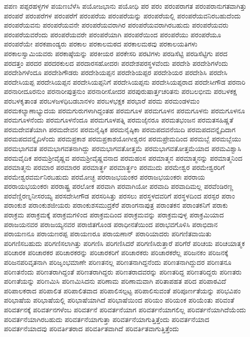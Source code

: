 {ಪಪಣ
ಪಪ್ಪರಹಳ್ಳಗಳ
ಪಯಣಬೆಳೆಸಿ
ಪಯೋಜಭಾನು
ಪಯೋಧಿ
ಪರ
ಪರಂ
ಪರಂಪರಾಗತ
ಪರಂಪರಾನುಗತವಾಗಿತ್ತು
ಪರಂಪರೆ
ಪರಂಪರೆಗಳ
ಪರಂಪರೆಗೆ
ಪರಂಪರೆಯ
ಪರಂಪರೆಯನ್ನು
ಪರಂಪರೆಯಲ್ಲಿ
ಪರಂಪರೆಯವನಿರಬಹುದೆಂದು
ಪರಂಪರೆಯವನು
ಪರಂಪರೆಯವನೇ
ಪರಂಪರೆಯವರಾಗಿರ
ಪರಂಪರೆಯವರಾಗಿರಬಹುದು
ಪರಂಪರೆಯವರು
ಪರಂಪರೆಯವರೆಂದು
ಪರಂಪರೆಯವರೇ
ಪರಂಪರೆಯಾಗಿ
ಪರಂಪರೆಯಿಂದ
ಪರಂಪರೆಯು
ಪರಂಪರೆಯೂ
ಪರಂಪರೆಯೇ
ಪರಕಪಾಂಡ್ಯರು
ಪರಕಾಲ
ಪರಕಾಲಮಠದ
ಪರಕಾಲಮಠವು
ಪರಕಾಲಯತಿಗಳು
ಪರಕಾಲಸ್ವಾಮಿಯವರು
ಪರಕಾಷ್ಠೆಯನ್ನು
ಪರಕೀಯರ
ಪರಕೇಸರಿ
ಪರಟಿಗಳು
ಪರಡಿಸೆಟ್ಟಿ
ಪರಡಿಸೆಟ್ಟಿಗು
ಪರದ
ಪರದತ್ತಂ
ಪರದರ
ಪರದರಕುಲದ
ಪರದಾರಸಹೋದರಃ
ಪರದೇಶಪರಸ್ಥಳವೆಂದು
ಪರದೇಶಿ
ಪರದೇಶಿಗಳೆಂದು
ಪರದೇಶಿಗಳೆಂದೂ
ಪರದೇಶಿಗೌಡರು
ಪರದೇಶಿಯಪ್ಪನ
ಪರದೇಶಿಯಪ್ಪರ
ಪರದೇಶಿಯರ
ಪರದೇಶಿಸಿ
ಪರದೇಸಿ
ಪರದೇಸಿಯಪ್ಪ
ಪರದೇಸಿಯಪ್ಪನ
ಪರದೇಸಿಯಪ್ಪನಿಗೆ
ಪರದೇಸಿಯಪ್ಪನು
ಪರದೇಸಿಯಪ್ಪರಾದ
ಪರದೇಸೀಗೌಡ
ಪರನಾರಿ
ಪರನಾರೀದೂರನುಂ
ಪರನಾರೀಪುತ್ರನುಂ
ಪರನಾರೀಸೋದರ
ಪರಪುರುಷಾರ್ತ್ತಚರಿತನು
ಪರಬಲಭೀಮ
ಪರಬಳಕಕ್ಷ
ಪರಬಳಕೃತಾಂತ
ಪರಬಳಜಳಧಿಬಡಬಾನಳಂ
ಪರಬಳಭಕ್ಷಕ
ಪರಭಾರೆ
ಪರಮ
ಪರಮಂಡಳಮಂ
ಪರಮಕಲ್ಯಾಣಾಭ್ಯುದಯ
ಪರಮಗುರುಗಳಾಗಿದ್ದಂತಹ
ಪರಮಗೂಳ
ಪರಮಗೂಳನ
ಪರಮಗೂಳನು
ಪರಮಗೂಳನೂ
ಪರಮಗೂಳನೆಂದು
ಪರಮಗೂಳನೆಂದೂ
ಪರಮಗೂಳಪತ್ನಿ
ಪರಮಜೈನರೂ
ಪರಮತಭಂಜನ
ಪರಮತಸಹಿಷ್ಣತೆ
ಪರಮದೇವತೆಯಾಗಿ
ಪರಮದೇವನ
ಪರಮನೈಷ್ಠಿಕ
ಪರಮನೈಷ್ಠಿಕಾ
ಪರಮಪದವನೆಯಿದಿ
ಪರಮಪದವನ್ನೈದಿದಾಗ
ಪರಮಪದವನ್ನೈದಿಳೆಂದು
ಪರಮಪ್ರಕಾಶ
ಪರಮಪ್ರಕಾಶಯೋಗೀಶ್ವರನ
ಪರಮಪ್ರೇಮದಿಂದ
ಪರಮಬ್ಬೆ
ಪರಮಬ್ಬೆಯು
ಪರಮಭಾಗವತ
ಪರಮಭಾಗವತನಾಗಿದ್ದು
ಪರಮಭಾಗವತೋತ್ತಮೆ
ಪರಮಭಾಗವತೋತ್ತಮೆಯಾದ
ಪರಮವಿಶ್ವಾಸಿ
ಪರಮವೈದಿಕ
ಪರಮಶ್ರೀವೈಷ್ಣವ
ಪರಮಶ್ರೀವೈಷ್ಣವನಾದ
ಪರಮಹಂಸ
ಪರಮಾತ್ಮನ
ಪರಮಾತ್ಮನನ್ನು
ಪರಮಾತ್ಮನಿಂದ
ಪರಮಾತ್ಮನು
ಪರಮಾರ
ಪರಮಾರರ
ಪರಮಾರ್ತ್ಥ
ಪರಮಾರ್ತ್ಥಂ
ಪರಮುದು
ಪರಮೇಶ್ವರ
ಪರಮೇಶ್ವರರಿಗೆ
ಪರಮೇಶ್ವರವರ್ಮನಿರಬಹುದು
ಪರಮೋಚ್ಛ
ಪರರಾಜಭಯಂಕರ
ಪರರಾಜಭಯಂಕರಃ
ಪರರಾಯ
ಪರರಾಯಭಯಂಕರಃ
ಪರರಾಷ್ಟ್ರ
ಪರಲೋಕ
ಪರವಾಗಿ
ಪರವಾಗಿಯೋ
ಪರವಾದಿ
ಪರವಾದಿಮಲ್ಲ
ಪರವೆಂಡಿರಣ್ಣ
ಪರವೆಣ್ಡಿರಣ್ನನೀಸರಯ್ಯ
ಪರಸದೇಸೀಗೌಡ
ಪರಸರಿಸಿತ್ತು
ಪರಸಲು
ಪರಸ್ಥಳದವರಿಗೆ
ಪರಸ್ಥಳದಿಂದ
ಪರಸ್ಪರ
ಪರಾಂ
ಪರಾಂಕುಶ
ಪರಾಂಕುಶಜೀಯರು
ಪರಾಂಕುಶಸಮುದ್ರಕೆರೆ
ಪರಾಂಗನಾಪುತ್ರ
ಪರಾಂತಕನ
ಪರಾಂತಕನಿಗೆ
ಪರಾಕು
ಪರಾಕ್ರಮ
ಪರಾಕ್ರಮಕ್ಕೆ
ಪರಾಕ್ರಮಗಳಿಂದ
ಪರಾಕ್ರಮದಿಂದ
ಪರಾಕ್ರಮವನ್ನು
ಪರಾಕ್ರಮವುಳ್ಳ
ಪರಾಕ್ರಮಿಯಾದ
ಪರಾಜಯನವರ
ಪರಾಜಯ್ಯನವರ
ಪರಾಜಿತಗೊಂಡ
ಪರಾಧೀನತೆಯಿಂದ
ಪರಾಭವಗೊಳಿಸಿ
ಪರಾಭಿದಾನ
ಪರಾಯಣನೂ
ಪರಾಯಣರಪ್ಪ
ಪರಾಯಣರೂ
ಪರಾಯಣಾನ್
ಪರಾರಿಯಾದರು
ಪರಿಗಣಿತವಾಯಿತು
ಪರಿಗಣಿಸಬಹುದು
ಪರಿಗಣಿಸಲಾಗಿತ್ತು
ಪರಿಗಣಿಸಿ
ಪರಿಗಣಿಸಿದರೆ
ಪರಿಗಣಿಸಿರುತ್ತಾರೆ
ಪರಿಗೆರೆ
ಪರಿಚಯ
ಪರಿಚಯಾತ್ಮಕ
ಪರಿಚಾರಕ
ಪರಿಚಾರಕರ
ಪರಿಚಾರಕರನ್ನು
ಪರಿಚಾರಕರಿಗೆ
ಪರಿಚಾರಕರು
ಪರಿಚಾರಕರೆಲ್ಲ
ಪರಿಜನಕಂ
ಪರಿಜನಕ್ಕೆ
ಪರಿಜನಪರಿವೃತನಾಗಿ
ಪರಿಜೃಂಭಮಾಣೇ
ಪರಿಣತನಲ್ಲ
ಪರಿಣತನಾಗಿದ್ದನೆಂದು
ಪರಿಣತನಾಗಿದ್ದುದರ
ಪರಿಣತನೂ
ಪರಿಣತನೆಂದು
ಪರಿಣತರಾಗಿದ್ದಂತೆ
ಪರಿಣತರಾಗಿದ್ದರು
ಪರಿಣತರಾದವರನ್ನು
ಪರಿಣತರಿದ್ದ
ಪರಿಣತರಿದ್ದರು
ಪರಿಣತರು
ಪರಿಣತೆಯನ್ನು
ಪರಿಣಮಿಸಿ
ಪರಿಣಮಿಸಿದನು
ಪರಿಣಾಮ
ಪರಿಣಾಮವಾಗಿ
ಪರಿತಾಪಹತ
ಪರಿದ
ಪರಿಪಾಠವಿದೆ
ಪರಿಪಾಲಕರಾದ
ಪರಿಪಾಲಿತ
ಪರಿಪಾಲಿತವಾದ
ಪರಿಪಾಲಿಸಲ್ಪಟ್ಟ
ಪರಿಪಾಲಿಸುವಂತೆ
ಪರಿಪೂರ್ಣತೆಯನ್ನು
ಪರಿಭವಿಪಂ
ಪರಿಭಾಷೆಯ
ಪರಿಭಾಷೆಯಲ್ಲಿ
ಪರಿಭಾಷೆಯಾಗಿದೆ
ಪರಿಭಾಷೆಯಿಂದ
ಪರಿಯಂ
ಪರಿಯಂಕ
ಪರಿಯೆಂತು
ಪರಿವಂತೆ
ಪರಿವರ್ತನಕ್ಕೆ
ಪರಿವರ್ತನಗಳೆಂಬ
ಪರಿವರ್ತನೆ
ಪರಿವರ್ತನೆಯಾಗ
ಪರಿವರ್ತನೆಯಾಗಲಿಲ್ಲ
ಪರಿವರ್ತನೆಯಾಗಿದೆಯೆಂದು
ಪರಿವರ್ತನೆಯಾಗಿರಬಹುದು
ಪರಿವರ್ತನೆಯಾಗುತ್ತಾ
ಪರಿವರ್ತನೆಯಾಗುತ್ತಿತ್ತೆಂದು
ಪರಿವರ್ತನೆಯಾದ
ಪರಿವರ್ತನೆಯಾದವು
ಪರಿವರ್ತಿತರಾದ
ಪರಿವರ್ತಿತವಾಗಿದೆ
ಪರಿವರ್ತಿತವಾಗುತ್ತಿತ್ತೆಂದು
}
